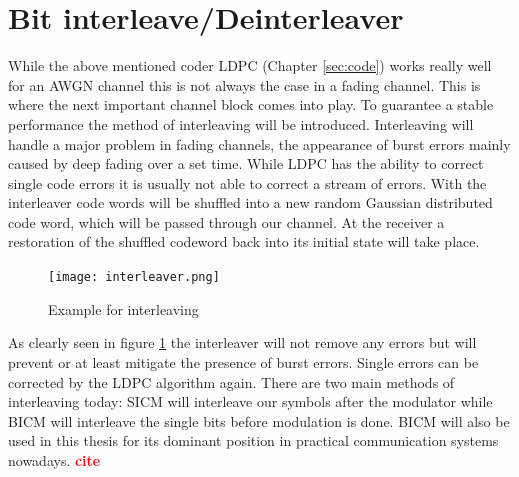 \documentclass[12pt,oneside, draft]{report}
\newcommand\boldred[1]{\textcolor{red}{\textbf{#1}}}
\begin{document}
\section{Bit interleave/Deinterleaver}
\label{sec:BIC}
While the above mentioned coder \gls{LDPC}  (Chapter \ref{sec:code}) works really well for an AWGN channel this is not always the case in a fading channel. This is where the next important channel block comes into play. To guarantee a stable performance the method of interleaving will be introduced. Interleaving will handle a major problem in fading channels, the appearance of burst errors mainly caused by deep fading over a set time. While \gls{LDPC} has the ability to correct single code errors it is usually not able to correct a stream of errors. With the interleaver code words will be shuffled into a new random Gaussian distributed code word, which will be passed through our channel. At the receiver a restoration of the shuffled codeword back into its initial state will take place.
\begin{figure}[H]
	\centering
	\texttt{[image: interleaver.png]}
	\caption{Example for interleaving}
	\label{fig:interleaver}
\end{figure}
As clearly seen in figure \ref{fig:interleaver} the interleaver will not remove any errors but will prevent or at least mitigate the presence of burst errors. Single errors can be corrected by the LDPC algorithm again.
There are two main methods of interleaving today: 
\gls{SICM} will interleave our symbols after the modulator while \gls{BICM} will interleave the single bits before modulation is done. BICM will also be used in this thesis for its dominant position in practical communication systems nowadays. \boldred{cite}
\newpage
\end{document}
